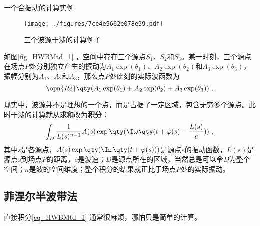 \begin{example}{一个合振动的计算实例}

\begin{figure}[ht]
\centering
\texttt{[image: ./figures/7ce4e9662e078e39.pdf]}
\caption{三个波源干涉的计算例子} \label{fig_HWBMtd_1}
\end{figure}

如图\autoref{fig_HWBMtd_1} ，空间中存在三个源点$S_1$、$S_2$和$S_3$。某一时刻，三个源点在场点$P$处分别独立产生的振动为$A_1\exp(\theta_1)$、$A_2\exp(\theta_2)$和$A_3\exp(\theta_3)$，振幅分别为$A_1$、$A_2$和$A_3$，那么点$P$处此刻的实际波函数为
\begin{equation}
\opn{Re}\qty(A_1\exp(\theta_1)+A_2\exp(\theta_2)+A_3\exp(\theta_3))~. 
\end{equation}

\end{example}




现实中，波源并不是理想的一个点，而是占据了一定区域，包含无穷多个源点。此时干涉的计算就从\textbf{求和}改为\textbf{积分}：
\begin{equation}\label{eq_HWBMtd_1}
\int_D \frac{1}{L(s)^{n-1}}A(s)\exp\qty(\I\omega\qty(t+\varphi(s)-\frac{L(s)}{c}))~, 
\end{equation}
其中$s$是各源点，$A(s)\exp\qty(\I\omega\qty(t+\varphi(s)))$是源点$s$的振动函数，$L(s)$是源点$s$到场点$P$的距离，$c$是波速；$D$是源点所在的区域，当然总是可以令$D$为整个空间；$n$是波的空间维度；整个积分的结果就正比于场点$P$处的实际振动。




\subsection{菲涅尔半波带法}


直接积分\autoref{eq_HWBMtd_1} 通常很麻烦，哪怕只是简单的计算。























